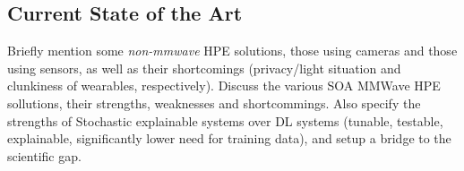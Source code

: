 \subsection{Current State of the Art}
\label{sub-section: introduction - background - current soa}
Briefly mention some \textit{non-mmwave} HPE solutions, those using cameras and those using sensors, as well as their shortcomings (privacy/light situation and clunkiness of wearables, respectively).
Discuss the various SOA MMWave HPE sollutions, their strengths, weaknesses and shortcommings.
Also specify the strengths of Stochastic explainable systems over DL systems (tunable, testable, explainable, significantly lower need for training data), and setup a bridge to the scientific gap.

